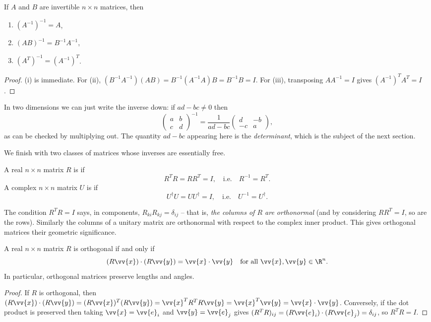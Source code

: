 \begin{proposition}
	If $A$ and $B$ are invertible $n \times n$ matrices, then
	\begin{enumerate}[label=(\roman*)]
		\item $(A^{-1})^{-1} = A$,
		\item $(AB)^{-1} = B^{-1}A^{-1}$,
		\item $(A^T)^{-1} = (A^{-1})^T$.
	\end{enumerate}
\end{proposition}
\begin{proof}
	(i) is immediate. For (ii), $(B^{-1}A^{-1})(AB) = B^{-1}(A^{-1}A)B = B^{-1}B = I$. For (iii), transposing $A A^{-1} = I$ gives $(A^{-1})^T A^T = I$.
\end{proof}

In two dimensions we can just write the inverse down: if $ad - bc \neq 0$ then
$$
\begin{pmatrix}
	a & b \\ c & d
\end{pmatrix}^{-1}
= \frac{1}{ad - bc}\begin{pmatrix}
	d & -b \\ -c & a
\end{pmatrix},
$$
as can be checked by multiplying out. The quantity $ad - bc$ appearing here is the \emph{determinant}, which is the subject of the next section.

We finish with two classes of matrices whose inverses are essentially free.

\begin{definition}
	A real $n \times n$ matrix $R$ is  if
	$$
	R^T R = R R^T = I, \quad \text{i.e.} \quad R^{-1} = R^T.
	$$
	A complex $n \times n$ matrix $U$ is  if
	$$
	U^\dagger U = U U^\dagger = I, \quad \text{i.e.} \quad U^{-1} = U^\dagger.
	$$
\end{definition}

The condition $R^TR = I$ says, in components, $R_{ki}R_{kj} = \delta_{ij}$ -- that is, \emph{the columns of $R$ are orthonormal} (and by considering $RR^T = I$, so are the rows). Similarly the columns of a unitary matrix are orthonormal with respect to the complex inner product. This gives orthogonal matrices their geometric significance.

\begin{proposition}
	A real $n \times n$ matrix $R$ is orthogonal if and only if
	$$
	(R\vv{x}) \cdot (R \vv{y}) = \vv{x} \cdot \vv{y} \quad \text{for all } \vv{x}, \vv{y} \in \R^n.
	$$
	In particular, orthogonal matrices preserve lengths and angles.
\end{proposition}
\begin{proof}
	If $R$ is orthogonal, then $(R\vv{x}) \cdot (R\vv{y}) = (R\vv{x})^T (R\vv{y}) = \vv{x}^T R^T R \vv{y} = \vv{x}^T \vv{y} = \vv{x} \cdot \vv{y}$. Conversely, if the dot product is preserved then taking $\vv{x} = \vv{e}_i$ and $\vv{y} = \vv{e}_j$ gives $(R^TR)_{ij} = (R\vv{e}_i)\cdot(R\vv{e}_j) = \delta_{ij}$, so $R^T R = I$.

\end{proof}

